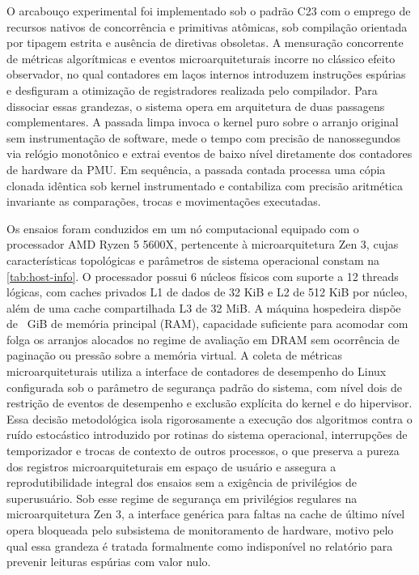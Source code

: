 \documentclass[12pt]{article}
\begin{document}
O arcabouço experimental foi implementado sob o padrão C23 com o emprego de recursos nativos de concorrência e primitivas atômicas, sob compilação orientada por tipagem estrita e ausência de diretivas obsoletas. A mensuração concorrente de métricas algorítmicas e eventos microarquiteturais incorre no clássico efeito observador, no qual contadores em laços internos introduzem instruções espúrias e desfiguram a otimização de registradores realizada pelo compilador. Para dissociar essas grandezas, o sistema opera em arquitetura de duas passagens complementares. A passada limpa invoca o kernel puro sobre o arranjo original sem instrumentação de software, mede o tempo com precisão de nanossegundos via relógio monotônico e extrai eventos de baixo nível diretamente dos contadores de hardware da PMU. Em sequência, a passada contada processa uma cópia clonada idêntica sob kernel instrumentado e contabiliza com precisão aritmética invariante as comparações, trocas e movimentações executadas.

Os ensaios foram conduzidos em um nó computacional equipado com o processador AMD Ryzen 5 5600X, pertencente à microarquitetura Zen 3, cujas características topológicas e parâmetros de sistema operacional constam na \cref{tab:host-info}. O processador possui 6 núcleos físicos com suporte a 12 threads lógicas, com caches privados L1 de dados de 32 KiB e L2 de 512 KiB por núcleo, além de uma cache compartilhada L3 de 32 MiB. A máquina hospedeira dispõe de \ValHostRamGib~GiB de memória principal (RAM), capacidade suficiente para acomodar com folga os arranjos alocados no regime de avaliação em DRAM sem ocorrência de paginação ou pressão sobre a memória virtual. A coleta de métricas microarquiteturais utiliza a interface de contadores de desempenho do Linux configurada sob o parâmetro de segurança padrão do sistema, com nível dois de restrição de eventos de desempenho e exclusão explícita do kernel e do hipervisor. Essa decisão metodológica isola rigorosamente a execução dos algoritmos contra o ruído estocástico introduzido por rotinas do sistema operacional, interrupções de temporizador e trocas de contexto de outros processos, o que preserva a pureza dos registros microarquiteturais em espaço de usuário e assegura a reprodutibilidade integral dos ensaios sem a exigência de privilégios de superusuário. Sob esse regime de segurança em privilégios regulares na microarquitetura Zen 3, a interface genérica para faltas na cache de último nível opera bloqueada pelo subsistema de monitoramento de hardware, motivo pelo qual essa grandeza é tratada formalmente como indisponível no relatório para prevenir leituras espúrias com valor nulo.
\end{document}

